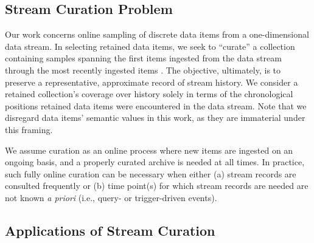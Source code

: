 \subsection{Stream Curation Problem}

Our work concerns online sampling of discrete data items from a one-dimensional data stream.
In selecting retained data items, we seek to ``curate'' a collection containing samples spanning the first items ingested from the data stream through the most recently ingested items \citep{moreno2024algorithms}.
The objective, ultimately, is to preserve a representative, approximate record of stream history.
We consider a retained collection's coverage over history solely in terms of the chronological positions retained data items were encountered in the data stream.
Note that we disregard data items' semantic values in this work, as they are immaterial under this framing.

We assume curation as an online process where new items are ingested on an ongoing basis, and a properly curated archive is needed at all times.
In practice, such fully online curation can be necessary when either (a) stream records are consulted frequently or (b) time point(s) for which stream records are needed are not known \textit{a priori} (i.e., query- or trigger-driven events).





\subsection{Applications of Stream Curation}

